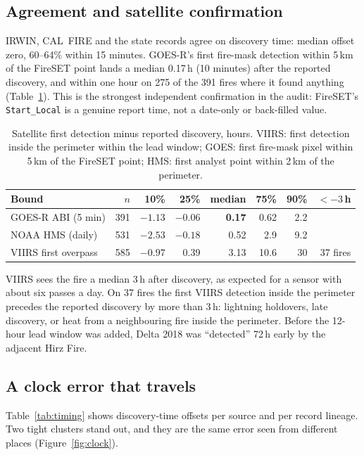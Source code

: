 \documentclass[11pt,a4paper]{article}
\begin{document}
\subsection{Agreement and satellite confirmation}

IRWIN, CAL~FIRE and the state records agree on discovery time: median offset zero, 60--64\% within 15 minutes.
GOES-R's first fire-mask detection within 5\,km of the FireSET point lands a median 0.17\,h (10 minutes) after
the reported discovery, and within one hour on 275 of the 391 fires where it found anything
(Table~\ref{tab:sat}). This is the strongest independent confirmation in the audit: FireSET's
\texttt{Start\_Local} is a genuine report time, not a date-only or back-filled value.

\begin{table}[h]
\centering\small
\caption{Satellite first detection minus reported discovery, hours. VIIRS: first detection inside the
perimeter within the lead window; GOES: first fire-mask pixel within 5\,km of the FireSET point; HMS: first
analyst point within 2\,km of the perimeter.}
\label{tab:sat}
\begin{tabular}{@{}lrrrrrrr@{}}
\toprule
Bound & $n$ & 10\% & 25\% & median & 75\% & 90\% & $< -3$\,h\\
\midrule
GOES-R ABI (5 min) & 391 & $-1.13$ & $-0.06$ & \textbf{0.17} & 0.62 & 2.2 & \\
NOAA HMS (daily) & 531 & $-2.53$ & $-0.18$ & 0.52 & 2.9 & 9.2 & \\
VIIRS first overpass & 585 & $-0.97$ & 0.39 & 3.13 & 10.6 & 30 & 37 fires\\
\bottomrule
\end{tabular}
\end{table}

VIIRS sees the fire a median 3\,h after discovery, as expected for a sensor with about six passes a day. On 37
fires the first VIIRS detection inside the perimeter precedes the reported discovery by more than 3\,h: lightning
holdovers, late discovery, or heat from a neighbouring fire inside the perimeter. Before the 12-hour lead
window was added, Delta 2018 was ``detected'' 72\,h early by the adjacent Hirz Fire.

\subsection{A clock error that travels}
\label{sec:clock}

Table~\ref{tab:timing} shows discovery-time offsets per source and per record lineage. Two tight clusters
stand out, and they are the same error seen from different places (Figure~\ref{fig:clock}).
\end{document}
